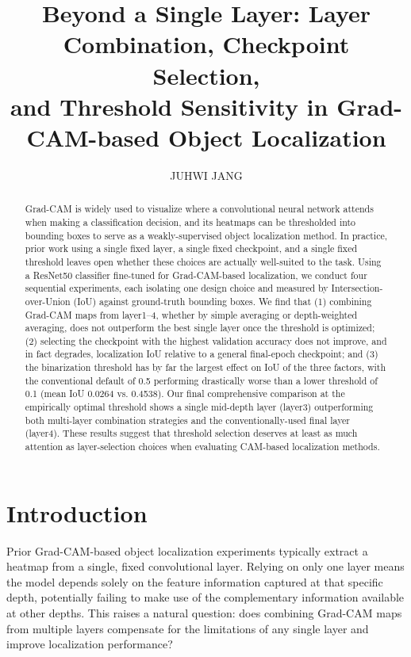 \documentclass[11pt]{article}
\title{\textbf{Beyond a Single Layer: Layer Combination, Checkpoint Selection,\\
and Threshold Sensitivity in Grad-CAM-based Object Localization}}
\author{JUHWI JANG}
\date{}
\begin{document}
\maketitle

\begin{abstract}
\noindent
Grad-CAM is widely used to visualize where a convolutional neural network attends when making a classification decision, and its heatmaps can be thresholded into bounding boxes to serve as a weakly-supervised object localization method. In practice, prior work using a single fixed layer, a single fixed checkpoint, and a single fixed threshold leaves open whether these choices are actually well-suited to the task. Using a ResNet50 classifier fine-tuned for Grad-CAM-based localization, we conduct four sequential experiments, each isolating one design choice and measured by Intersection-over-Union (IoU) against ground-truth bounding boxes. We find that (1) combining Grad-CAM maps from layer1--4, whether by simple averaging or depth-weighted averaging, does not outperform the best single layer once the threshold is optimized; (2) selecting the checkpoint with the highest validation accuracy does not improve, and in fact degrades, localization IoU relative to a general final-epoch checkpoint; and (3) the binarization threshold has by far the largest effect on IoU of the three factors, with the conventional default of 0.5 performing drastically worse than a lower threshold of 0.1 (mean IoU 0.0264 vs. 0.4538). Our final comprehensive comparison at the empirically optimal threshold shows a single mid-depth layer (layer3) outperforming both multi-layer combination strategies and the conventionally-used final layer (layer4). These results suggest that threshold selection deserves at least as much attention as layer-selection choices when evaluating CAM-based localization methods.
\end{abstract}

\section{Introduction}

Prior Grad-CAM-based object localization experiments typically extract a heatmap from a single, fixed convolutional layer. Relying on only one layer means the model depends solely on the feature information captured at that specific depth, potentially failing to make use of the complementary information available at other depths. This raises a natural question: does combining Grad-CAM maps from multiple layers compensate for the limitations of any single layer and improve localization performance?
\end{document}
